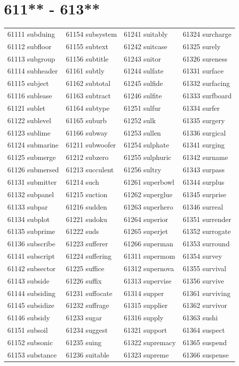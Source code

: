 \documentclass[10pt, oneside]{book}
\begin{document}
\begin{table}
	\centering
	\section*{611** - 613**}
	\begin{tabular}{l l l l}
61111 subduing &61154 subsystem &61241 suitably &61324 surcharge\\
61112 subfloor &61155 subtext &61242 suitcase &61325 surely\\
61113 subgroup &61156 subtitle &61243 suitor &61326 sureness\\
61114 subheader &61161 subtly &61244 sulfate &61331 surface\\
61115 subject &61162 subtotal &61245 sulfide &61332 surfacing\\
61116 sublease &61163 subtract &61246 sulfite &61333 surfboard\\
61121 sublet &61164 subtype &61251 sulfur &61334 surfer\\
61122 sublevel &61165 suburb &61252 sulk &61335 surgery\\
61123 sublime &61166 subway &61253 sullen &61336 surgical\\
61124 submarine &61211 subwoofer &61254 sulphate &61341 surging\\
61125 submerge &61212 subzero &61255 sulphuric &61342 surname\\
61126 submersed &61213 succulent &61256 sultry &61343 surpass\\
61131 submitter &61214 such &61261 superbowl &61344 surplus\\
61132 subpanel &61215 suction &61262 superglue &61345 surprise\\
61133 subpar &61216 sudden &61263 superhero &61346 surreal\\
61134 subplot &61221 sudoku &61264 superior &61351 surrender\\
61135 subprime &61222 suds &61265 superjet &61352 surrogate\\
61136 subscribe &61223 sufferer &61266 superman &61353 surround\\
61141 subscript &61224 suffering &61311 supermom &61354 survey\\
61142 subsector &61225 suffice &61312 supernova &61355 survival\\
61143 subside &61226 suffix &61313 supervise &61356 survive\\
61144 subsiding &61231 suffocate &61314 supper &61361 surviving\\
61145 subsidize &61232 suffrage &61315 supplier &61362 survivor\\
61146 subsidy &61233 sugar &61316 supply &61363 sushi\\
61151 subsoil &61234 suggest &61321 support &61364 suspect\\
61152 subsonic &61235 suing &61322 supremacy &61365 suspend\\
61153 substance &61236 suitable &61323 supreme &61366 suspense\\
	\end{tabular}
 \end{table}
\clearpage
\end{document}
